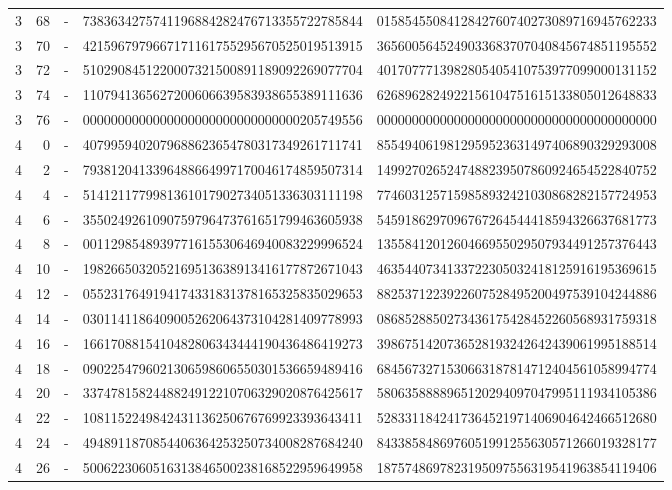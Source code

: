 \begin{longtable}{rrrll}
3 & 68 & - & 7383634275741196884282476713355722785844 & 0158545508412842760740273089716945762233 \\
3 & 70 & - & 4215967979667171161755295670525019513915 & 3656005645249033683707040845674851195552 \\
3 & 72 & - & 5102908451220007321500891189092269077704 & 4017077713982805405410753977099000131152 \\
3 & 74 & - & 1107941365627200606639583938655389111636 & 6268962824922156104751615133805012648833 \\
3 & 76 & - & 0000000000000000000000000000000205749556 & 0000000000000000000000000000000000000000 \\
4 & 0 & - & 4079959402079688623654780317349261711741 & 8554940619812959523631497406890329293008 \\
4 & 2 & - & 7938120413396488664997170046174859507314 & 1499270265247488239507860924654522840752 \\
4 & 4 & - & 5141211779981361017902734051336303111198 & 7746031257159858932421030868282157724953 \\
4 & 6 & - & 3550249261090759796473761651799463605938 & 5459186297096767264544418594326637681773 \\
4 & 8 & - & 0011298548939771615530646940083229996524 & 1355841201260466955029507934491257376443 \\
4 & 10 & - & 1982665032052169513638913416177872671043 & 4635440734133722305032418125916195369615 \\
4 & 12 & - & 0552317649194174331831378165325835029653 & 8825371223922607528495200497539104244886 \\
4 & 14 & - & 0301141186409005262064373104281409778993 & 0868528850273436175428452260568931759318 \\
4 & 16 & - & 1661708815410482806343444190436486419273 & 3986751420736528193242642439061995188514 \\
4 & 18 & - & 0902254796021306598606550301536659489416 & 6845673271530663187814712404561058994774 \\
4 & 20 & - & 3374781582448824912210706329020876425617 & 5806358888965120294097047995111934105386 \\
4 & 22 & - & 1081152249842431136250676769923393643411 & 5283311842417364521971406904642466512680 \\
4 & 24 & - & 4948911870854406364253250734008287684240 & 8433858486976051991255630571266019328177 \\
4 & 26 & - & 5006223060516313846500238168522959649958 & 1875748697823195097556319541963854119406 \\

\end{longtable}
